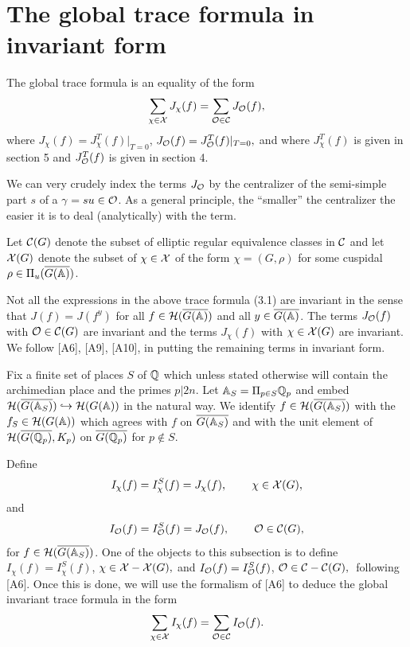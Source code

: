 
\section{The global trace formula in invariant form}

The global trace formula is an equality of the form 
\begin{equation}
\sum_{\chi \in {\cal X}}J_\chi (f) =\sum_{{\cal{O}}\in {\cal C}}
J_{{\cal{O}}}(f),
\end{equation}
where $J_\chi (f)=J_\chi ^T(f)|_{T=0}$,
$J_{{\cal{O}}}(f)=J_{{\cal{O}}}^T(f)|_{T=0},$ and where
$J_\chi ^T(f)$ is given in section 5 and
$J_{{\cal{O}}}^T(f)$ is given in section 4.

We can very crudely index the terms $J_{\cal{O}}$ by the centralizer
of the semi-simple part $s$ of a $\gamma =su\in {\cal{O}}$. As a
general principle, the ``smaller'' the centralizer the easier it is
to deal (analytically) with the term. 

Let ${\cal C}(G)$ denote the subset
of elliptic regular equivalence classes in ${\cal C}$ and let
${\cal{X}}(G)$
denote the subset of $\chi \in {\cal{X}}$ of the form $\chi=(G,\rho )$ for
some cuspidal
$\rho \in \Pi _u(\overline{G({\Bbb {A}})})$.

Not all the expressions in the above trace formula (3.1) are invariant in
the sense that $J(f)=J(f^y)$ for all
$f\in {\cal{H}}(\overline{G({\Bbb {A}})}) $ and all
$y\in \overline{G({\Bbb {A}})}$. The terms $J_{{\cal{O}}}(f)$
with ${\cal{O}}\in {\cal{C}}(G)$ are invariant and the terms
$J_\chi (f)$ with $\chi \in {\cal{X}}(G)$ are invariant.
We follow [A6], [A9], [A10], in putting
the remaining terms in invariant form.

Fix a finite set of places $S$ of ${\Bbb {Q}}$ which
unless stated otherwise
will contain the archimedian place and the primes $p|2n$.
Let ${\Bbb {A}}_S=\Pi _{p\in S}{\Bbb {Q}}_p$ and embed
${\cal{H}}(\overline{G({\Bbb{A}}_S)})\hookrightarrow {\cal{H}}(G({\Bbb {A}))}$
in the natural way. We identify $f\in {\cal{H}}(\overline{G({\Bbb{A}}_S)})$
with the $f_S\in {\cal{H}}(G({\Bbb {A}}))$ which agrees
with $f$ on $\overline{G({\Bbb{A}}_S)}$ and with the unit
element of ${\cal{H}}(\overline{G({\Bbb{Q}}_p)},K_p)$
on $\overline{G({\Bbb{Q}}_p)} $ for $p\notin S$.

Define 
\begin{equation}
I_\chi (f)=I_\chi ^S(f)=J_\chi (f),\;\;\;\;\;\;\;\;\chi \in {\cal{X}}(G),
\end{equation}
and 
\begin{equation}
I_{{\cal{O}}}(f)=I_{{\cal{O}}}^S(f)=J_{{\cal{O}}}(f),
\;\;\;\;\;\;\;\;{\cal{O}}\in {\cal C}(G),
\end{equation}
for $f\in {\cal{H}}(\overline{G({\Bbb{A}}_S)})$. One of the objects to this subsection
is to define $I_\chi (f)=I_\chi ^S(f)$,
$\chi \in {\cal{X}}-{\cal{X}}(G), $
and $I_{{\cal{O}}}(f)=I_{{\cal{O}}}^S(f)$,
${\cal{O}}\in {\cal C}-{\cal C}(G),\;$%
following [A6]. Once this is done, we will use the formalism of [A6] to
deduce the global invariant trace formula in the form 
\begin{equation}
\sum_{\chi \in {\cal{X}}}I_\chi (f)=\sum_{{\cal{O}}\in {\cal C}}
I_{{\cal{O}}}(f).
\end{equation}

